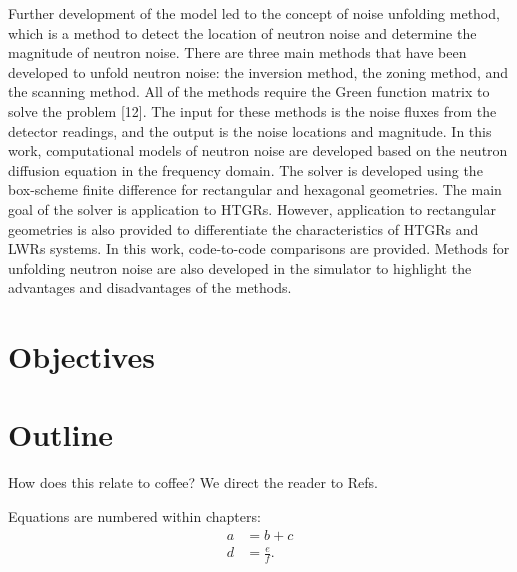Further development of the model led to the concept of noise unfolding method, which is a method to detect the location of neutron noise and determine the magnitude of neutron noise. There are three main methods that have been developed to unfold neutron noise: the inversion method, the zoning method, and the scanning method. All of the methods require the Green function matrix to solve the problem [12]. The input for these methods is the noise fluxes from the detector readings, and the output is the noise locations and magnitude.
In this work, computational models of neutron noise are developed based on the neutron diffusion equation in the frequency domain. The solver is developed using the box-scheme finite difference for rectangular and hexagonal geometries. The main goal of the solver is application to HTGRs. However, application to rectangular geometries is also provided to differentiate the characteristics of HTGRs and LWRs systems. In this work, code-to-code comparisons are provided. Methods for unfolding neutron noise are also developed in the simulator to highlight the advantages and disadvantages of the methods. 


\section{Objectives}

\section{Outline}

How does this relate to coffee? We direct the reader to Refs.

Equations are numbered within chapters:
\begin{align}
    a
    &= b + c \\
    d
    &= \frac{e}{f}.
\end{align}

% 
% 
% 
% 
